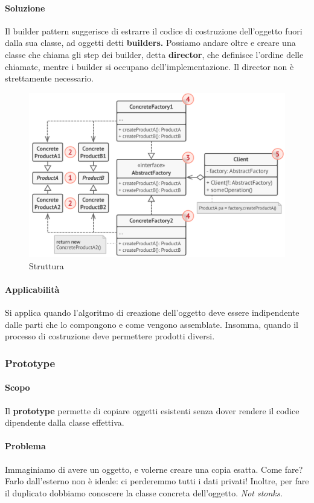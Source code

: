 \documentclass[11pt]{article}
\begin{document}
\paragraph{Soluzione}
Il builder pattern suggerisce di estrarre il codice di costruzione dell'oggetto fuori dalla sua classe, ad oggetti detti \textbf{builders.} Possiamo andare oltre e creare una classe che chiama gli step dei builder, detta \textbf{director}, che definisce l'ordine delle chiamate, mentre i builder si occupano dell'implementazione. 
Il director non è strettamente necessario.
\begin{figure}[H]
    \centering
    \includegraphics[width=\linewidth]{res/teoria/AbstractFactory.png}
    \caption{Struttura}
\end{figure}
\paragraph{Applicabilità}
Si applica quando l'algoritmo di creazione dell'oggetto deve essere indipendente dalle parti che lo compongono e come vengono assemblate. Insomma, quando il processo di costruzione deve permettere prodotti diversi.
\subsubsection{Prototype}
\paragraph{Scopo}
Il \textbf{prototype} permette di copiare oggetti esistenti senza dover rendere il codice dipendente dalla classe effettiva.
\paragraph{Problema}
Immaginiamo di avere un oggetto, e volerne creare una copia esatta. Come fare? Farlo dall'esterno non è ideale: ci perderemmo tutti i dati privati! Inoltre, per fare il duplicato dobbiamo conoscere la classe concreta dell'oggetto. \textit{Not stonks.}
\end{document}
